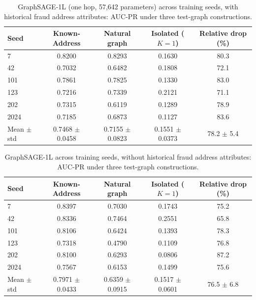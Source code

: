 \begin{table}[!htbp]
\centering
\small
\caption{GraphSAGE-1L (one hop, 57{,}642 parameters) across training seeds, with historical fraud address attributes: AUC-PR under three test-graph constructions.}
\label{tab:seeds_sage_full}
\begin{tabular}{lcccc}
\hline
Seed & Known-Address & Natural graph & Isolated ($K{=}1$) & Relative drop (\%) \\
\hline
7 & 0.8200 & 0.8293 & 0.1630 & 80.3 \\
42 & 0.7032 & 0.6482 & 0.1808 & 72.1 \\
101 & 0.7861 & 0.7825 & 0.1330 & 83.0 \\
123 & 0.7216 & 0.7339 & 0.2121 & 71.1 \\
202 & 0.7315 & 0.6119 & 0.1289 & 78.9 \\
2024 & 0.7185 & 0.6873 & 0.1127 & 83.6 \\
\hline
Mean $\pm$ std & 0.7468 $\pm$ 0.0458 & 0.7155 $\pm$ 0.0823 & 0.1551 $\pm$ 0.0373 & 78.2 $\pm$ 5.4 \\
\hline
\end{tabular}
\end{table}

\begin{table}[!htbp]
\centering
\small
\caption{GraphSAGE-1L across training seeds, without historical fraud address attributes: AUC-PR under three test-graph constructions.}
\label{tab:seeds_sage_no_fraud}
\begin{tabular}{lcccc}
\hline
Seed & Known-Address & Natural graph & Isolated ($K{=}1$) & Relative drop (\%) \\
\hline
7 & 0.8397 & 0.7030 & 0.1743 & 75.2 \\
42 & 0.8336 & 0.7464 & 0.2551 & 65.8 \\
101 & 0.8106 & 0.6424 & 0.1393 & 78.3 \\
123 & 0.7318 & 0.4790 & 0.1109 & 76.8 \\
202 & 0.8100 & 0.6293 & 0.0806 & 87.2 \\
2024 & 0.7567 & 0.6153 & 0.1499 & 75.6 \\
\hline
Mean $\pm$ std & 0.7971 $\pm$ 0.0433 & 0.6359 $\pm$ 0.0915 & 0.1517 $\pm$ 0.0601 & 76.5 $\pm$ 6.8 \\
\hline
\end{tabular}
\end{table}
